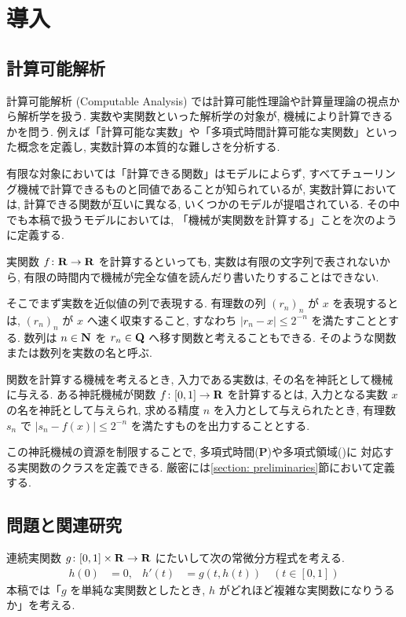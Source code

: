 \section{導入}

\subsection{計算可能解析}

計算可能解析 (Computable Analysis) では計算可能性理論や計算量理論の視点から解析学を扱う. 
実数や実関数といった解析学の対象が, 機械により計算できるかを問う. 
例えば「計算可能な実数」や「多項式時間計算可能な実関数」といった概念を定義し, 
実数計算の本質的な難しさを分析する.

有限な対象においては「計算できる関数」はモデルによらず,
すべてチューリング機械で計算できるものと同値であることが知られているが,
実数計算においては, 計算できる関数が互いに異なる, いくつかのモデルが提唱されている.
その中でも本稿で扱うモデルにおいては,
「機械が実関数を計算する」ことを次のように定義する.

実関数 $f \colon \mathbf R \to \mathbf R$ を計算するといっても,
実数は有限の文字列で表されないから, 
有限の時間内で機械が完全な値を読んだり書いたりすることはできない.

そこでまず実数を近似値の列で表現する.
有理数の列 $(r_n)_n$ が $x$ を表現するとは,
$(r_n)_n$ が $x$ へ速く収束すること, 
すなわち $|r_n - x| \le 2^{-n}$ を満たすこととする.
数列は $n \in \mathbf N$ を $r_n \in \mathbf Q$ へ移す関数と考えることもできる.
そのような関数または数列を実数の名と呼ぶ.

関数を計算する機械を考えるとき,
入力である実数は, その名を神託として機械に与える.
ある神託機械が関数 $f \colon [0, 1] \to \mathbf R$ を計算するとは,
入力となる実数 $x$ の名を神託として与えられ,
求める精度 $n$ を入力として与えられたとき,
有理数 $s_n$ で $|s_n - f(x)| \le 2^{-n}$ を満たすものを出力することとする.

この神託機械の資源を制限することで, 多項式時間({\bf P})や多項式領域(\PSPACE)に
対応する実関数のクラスを定義できる.
厳密には\ref{section: preliminaries}節において定義する.

\subsection{問題と関連研究}

連続実関数 $g \colon [0,1] \times \mathbf R \to \mathbf R$ にたいして次の常微分方程式を考える. 
\begin{align}
 \label{eq:ode}
 h(0) & = 0, &
 h'(t) & = g(t,h(t)) \quad (t \in [0,1])
\end{align}
本稿では「$g$ を単純な実関数としたとき, 
$h$ がどれほど複雑な実関数になりうるか」を考える.

